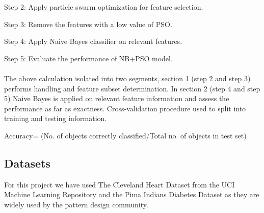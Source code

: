 \documentclass[oneside,12pt]{Classes/VTU}
\begin{document}
    Step 2: Apply particle swarm optimization for feature selection. 
    
    Step 3: Remove the features with a low value of PSO.
    
    Step 4: Apply Naive Bayes classifier on relevant features. 
    
    Step 5: Evaluate the performance of NB+PSO model.
    
    \paragraph{}
    The above calculation isolated into two segments, section 1 (step 2 and step 3) performs handling and feature subset determination. In section 2 (step 4 and step 5) Naive Bayes is applied on relevant feature information and assess the performance as far as exactness. Cross-validation procedure used to split into training and testing information.     
    \begin{center}
    	Accuracy= (No. of objects correctly classified/Total no. of objects in test set)      
    \end{center}
    
    
    \subsection{Datasets}
    For this project we have used The Cleveland Heart Dataset from the UCI Machine Learning Repository and the Pima Indians Diabetes Dataset as they are widely used by the pattern design community. 
    \linebreak
\end{document}
